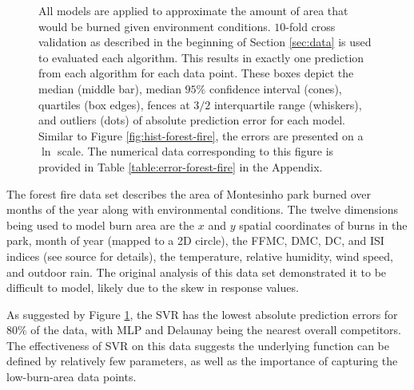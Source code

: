 \documentclass[smallextended,final]{svjour3}  %
\begin{document}
\begin{figure}
  \centering
  \caption{All models are applied to approximate the amount of area
    that would be burned given environment conditions. $10$-fold cross
    validation as described in the beginning of Section \ref{sec:data}
    is used to evaluated each algorithm. This results in exactly one
    prediction from each algorithm for each data point. These boxes
    depict the median (middle bar), median $95\%$ confidence interval
    (cones), quartiles (box edges), fences at $3/2$ interquartile
    range (whiskers), and outliers (dots) of absolute prediction error
    for each model. Similar to Figure \ref{fig:hist-forest-fire}, the
    errors are presented on a $\ln$ scale. The numerical data
    corresponding to this figure is provided in Table
    \ref{table:error-forest-fire} in the Appendix.}
  \label{fig:error-forest-fire}
\end{figure}


The forest fire data set \cite{cortez2007data} describes the area of
Montesinho park burned over months of the year along with
environmental conditions. The twelve dimensions being used to model
burn area are the $x$ and $y$ spatial coordinates of burns in the
park, month of year (mapped to a 2D circle), the FFMC, DMC, DC, and
ISI indices (see source for details), the temperature, relative
humidity, wind speed, and outdoor rain. The original analysis of this
data set demonstrated it to be difficult to model, likely due to the
skew in response values.

As suggested by Figure \ref{fig:error-forest-fire}, the SVR has the
lowest absolute prediction errors for $80\%$ of the data, with MLP and
Delaunay being the nearest overall competitors. The effectiveness of
SVR on this data suggests the underlying function can be defined by
relatively few parameters, as well as the importance of capturing the
low-burn-area data points.
\end{document}
